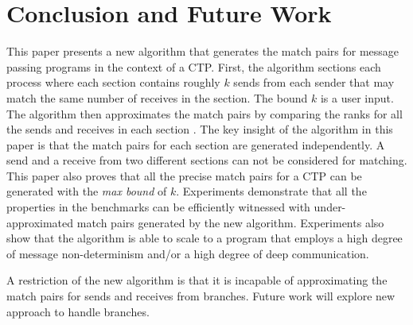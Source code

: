 \section{Conclusion and Future Work}
This paper presents a new algorithm that generates the match pairs for message passing programs in the context of a CTP.
First, the algorithm sections each process where each section contains roughly $k$ sends from each sender that may match the same number of receives in the section. The bound $k$ is a user input.
The algorithm then approximates the match pairs by comparing the ranks for all the sends and receives in each section \cite{DBLP:conf/kbse/HuangMM13}. The key insight of the algorithm in this paper is that the match pairs for each section are generated independently. 
A send and a receive from two different sections can not be considered for matching. 
This paper also proves that all the precise match pairs for a CTP can be generated with the \textit{max bound} of $k$. Experiments demonstrate that all the properties in the benchmarks can be efficiently witnessed with under-approximated match pairs generated by the new algorithm. Experiments also show that the algorithm is able to scale to a program that employs a high degree of message non-determinism and/or a high degree of deep communication.

A restriction of the new algorithm is that it is incapable of approximating the match pairs for sends and receives from branches. Future work will explore new approach to handle branches.


